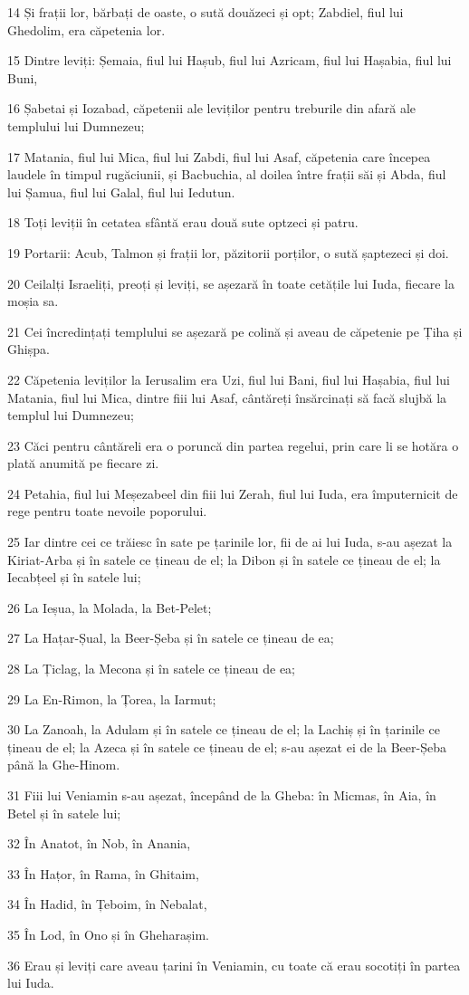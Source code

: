 \par 14 Și frații lor, bărbați de oaste, o sută douăzeci și opt; Zabdiel, fiul lui Ghedolim, era căpetenia lor.
\par 15 Dintre leviți: Șemaia, fiul lui Hașub, fiul lui Azricam, fiul lui Hașabia, fiul lui Buni,
\par 16 Șabetai și Iozabad, căpetenii ale leviților pentru treburile din afară ale templului lui Dumnezeu;
\par 17 Matania, fiul lui Mica, fiul lui Zabdi, fiul lui Asaf, căpetenia care începea laudele în timpul rugăciunii, și Bacbuchia, al doilea între frații săi și Abda, fiul lui Șamua, fiul lui Galal, fiul lui Iedutun.
\par 18 Toți leviții în cetatea sfântă erau două sute optzeci și patru.
\par 19 Portarii: Acub, Talmon și frații lor, păzitorii porților, o sută șaptezeci și doi.
\par 20 Ceilalți Israeliți, preoți și leviți, se așezară în toate cetățile lui Iuda, fiecare la moșia sa.
\par 21 Cei încredințați templului se așezară pe colină și aveau de căpetenie pe Țiha și Ghișpa.
\par 22 Căpetenia leviților la Ierusalim era Uzi, fiul lui Bani, fiul lui Hașabia, fiul lui Matania, fiul lui Mica, dintre fiii lui Asaf, cântăreți însărcinați să facă slujbă la templul lui Dumnezeu;
\par 23 Căci pentru cântăreli era o poruncă din partea regelui, prin care li se hotăra o plată anumită pe fiecare zi.
\par 24 Petahia, fiul lui Meșezabeel din fiii lui Zerah, fiul lui Iuda, era împuternicit de rege pentru toate nevoile poporului.
\par 25 Iar dintre cei ce trăiesc în sate pe țarinile lor, fii de ai lui Iuda, s-au așezat la Kiriat-Arba și în satele ce țineau de el; la Dibon și în satele ce țineau de el; la Iecabțeel și în satele lui;
\par 26 La Ieșua, la Molada, la Bet-Pelet;
\par 27 La Hațar-Șual, la Beer-Șeba și în satele ce țineau de ea;
\par 28 La Țiclag, la Mecona și în satele ce țineau de ea;
\par 29 La En-Rimon, la Țorea, la Iarmut;
\par 30 La Zanoah, la Adulam și în satele ce țineau de el; la Lachiș și în țarinile ce țineau de el; la Azeca și în satele ce țineau de el; s-au așezat ei de la Beer-Șeba până la Ghe-Hinom.
\par 31 Fiii lui Veniamin s-au așezat, începând de la Gheba: în Micmas, în Aia, în Betel și în satele lui;
\par 32 În Anatot, în Nob, în Anania,
\par 33 În Hațor, în Rama, în Ghitaim,
\par 34 În Hadid, în Țeboim, în Nebalat,
\par 35 În Lod, în Ono și în Gheharașim.
\par 36 Erau și leviți care aveau țarini în Veniamin, cu toate că erau socotiți în partea lui Iuda.

